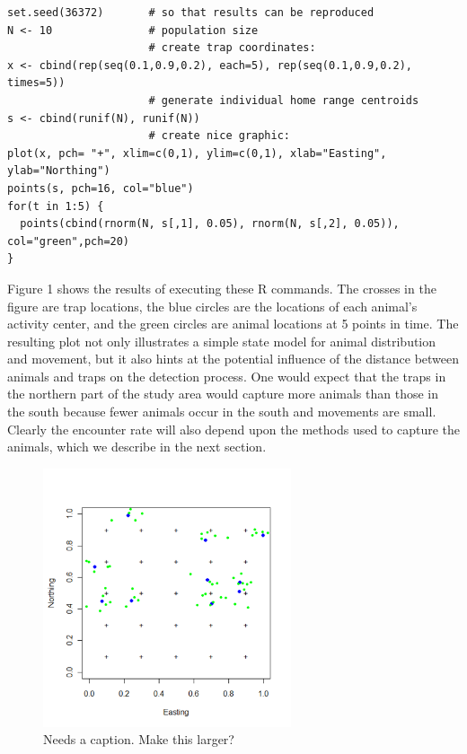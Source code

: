 {\small
\begin{verbatim}
set.seed(36372)       # so that results can be reproduced
N <- 10               # population size
                      # create trap coordinates:
x <- cbind(rep(seq(0.1,0.9,0.2), each=5), rep(seq(0.1,0.9,0.2), times=5)) 
                      # generate individual home range centroids
s <- cbind(runif(N), runif(N))    
                      # create nice graphic:
plot(x, pch= "+", xlim=c(0,1), ylim=c(0,1), xlab="Easting", ylab="Northing")
points(s, pch=16, col="blue") 
for(t in 1:5) {
  points(cbind(rnorm(N, s[,1], 0.05), rnorm(N, s[,2], 0.05)), col="green",pch=20)
}
\end{verbatim}
}

Figure 1 shows the results of executing these R commands. The crosses
in the figure are trap locations, the blue circles are the locations
of each animal's activity center, and the green circles are animal
locations at 5 points in time.  The resulting plot not only
illustrates a simple state model for animal distribution and movement,
but it also hints at the potential influence of the distance between
animals and traps on the detection process. One would expect that the
traps in the northern part of the study area would capture more
animals than those in the south because fewer animals occur in the
south and movements are small. Clearly the encounter rate will also
depend upon the methods used to capture the animals, which we describe
in the next section.

\begin{figure}
\begin{center}
\includegraphics[height=3in]{Ch1/figs/northingeasting}
\end{center}
\caption{Needs a caption. Make this larger?}
\label{fig.Rcommands}
\end{figure}


